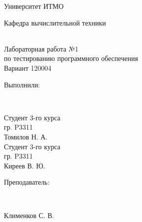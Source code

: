 \begin{titlepage}
        \newpage
        \begin{large}
                \begin{center}
                        Университет ИТМО\\

                        \vspace{5em}
                        \begin{scshape} Кафедра вычислительной техники \end{scshape}\\

                        \vspace{4em}
                        Лабораторная работа №1\\
                        по тестированию программного обеспечения\\

                        \vspace{1em}
                        Вариант 120004
                \end{center}

                \begin{flushright}
                        \vspace{6em}
                        \begin{bfseries} Выполнили: \end{bfseries}\\
                        \begin{itshape}
                                Студент 3-го курса\\
                                гр. P3311\\
                                Томилов Н. А.\\
                                Студент 3-го курса\\
                                гр. P3311\\
                                Киреев В. Ю.\\
                        \end{itshape}

                        \vspace{3em}
                        \begin{bfseries} Преподаватель: \end{bfseries}\\
                        \begin{itshape}
                                Клименков С. В. \\
                        \end{itshape}
                \end{flushright}


\end{large}
\end{titlepage}
